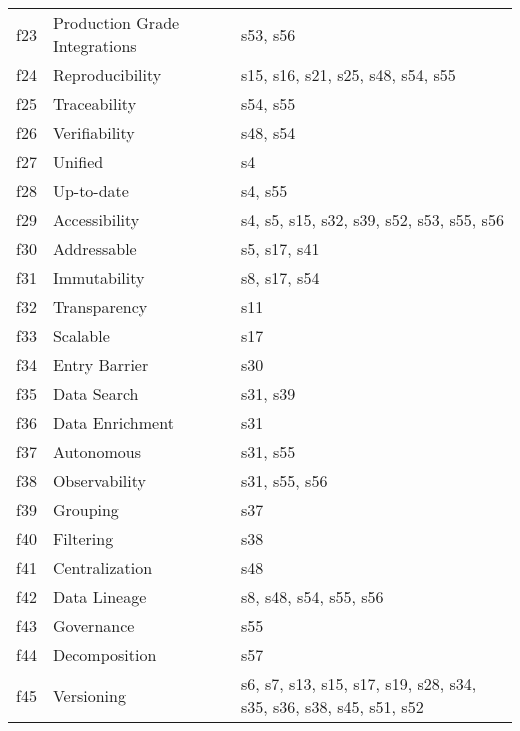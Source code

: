 \begin{tabular}{|c|p{}|p{}|}
f23 & Production Grade Integrations & \cellcolor{emerald_shape_1} {s53, s56}\\
f24 & Reproducibility & \cellcolor{emerald_shape_3} {s15, s16, s21, s25, s48, s54, s55}\\
f25 & Traceability & \cellcolor{emerald_shape_1} {s54, s55}\\
f26 & Verifiability & \cellcolor{emerald_shape_1} {s48, s54}\\
f27 & Unified & \cellcolor{emerald_shape_1} {s4}\\
f28 & Up-to-date & \cellcolor{emerald_shape_1} {s4, s55}\\
f29 & Accessibility & \cellcolor{emerald_shape_4} {s4, s5, s15, s32, s39, s52, s53, s55, s56}\\
f30 & Addressable & \cellcolor{emerald_shape_2} {s5, s17, s41}\\
f31 & Immutability & \cellcolor{emerald_shape_2} {s8, s17, s54}\\
f32 & Transparency & \cellcolor{emerald_shape_1} {s11}\\
f33 & Scalable & \cellcolor{emerald_shape_1} {s17}\\
f34 & Entry Barrier & \cellcolor{emerald_shape_1} {s30}\\
f35 & Data Search & \cellcolor{emerald_shape_1} {s31, s39}\\
f36 & Data Enrichment & \cellcolor{emerald_shape_1} {s31}\\
f37 & Autonomous & \cellcolor{emerald_shape_1} {s31, s55}\\
f38 & Observability & \cellcolor{emerald_shape_2} {s31, s55, s56}\\
f39 & Grouping & \cellcolor{emerald_shape_1} {s37}\\
f40 & Filtering & \cellcolor{emerald_shape_1} {s38}\\
f41 & Centralization & \cellcolor{emerald_shape_1} {s48}\\
f42 & Data Lineage & \cellcolor{emerald_shape_3} {s8, s48, s54, s55, s56}\\
f43 & Governance & \cellcolor{emerald_shape_1} {s55}\\
f44 & Decomposition & \cellcolor{emerald_shape_1} {s57}\\
f45 & Versioning & \cellcolor{emerald_shape_4} {s6, s7, s13, s15, s17, s19, s28, s34, s35, s36, s38, s45, s51, s52}\\
\hline
\end{tabular}
